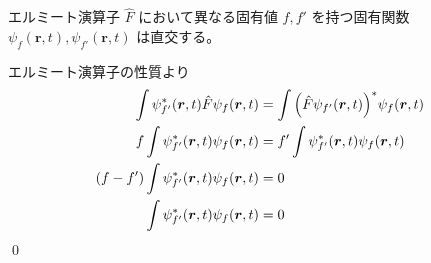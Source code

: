 \documentclass[uplatex,dvipdfmx,a4paper,11pt]{jlreq}
\makeatletter
\newcommand{\rr}{\bm{r}}
\theoremstyle{definition}
\renewenvironment{proof}[1][\proofname]{\par
  \normalfont
  \topsep6\p@\@plus6\p@ \trivlist
  \item[\hskip\labelsep{\bfseries #1}\@addpunct{\bfseries}]\ignorespaces\quad\par
}{%
  \qed\endtrivlist\@endpefalse
}
\renewcommand\proofname{証明}
\makeatother
\begin{document}
\begin{theorem}
  エルミート演算子 $\hat{F}$ において異なる固有値 $f, f'$ を持つ固有関数 $\psi_f(\rr, t), \psi_{f'}(\rr, t)$ は直交する。
\end{theorem}
\begin{proof}
  エルミート演算子の性質より
  \begin{align}
    \int\psi_{f'}^*(\rr, t)\hat{F}\psi_f(\rr, t)  & = \int\qty(\hat{F}\psi_{f'}(\rr, t))^*\psi_f(\rr, t) \\
    f\int\psi_{f'}^*(\rr, t)\psi_f(\rr, t)        & = f'\int\psi_{f'}^*(\rr, t)\psi_f(\rr, t)            \\
    (f - f')\int\psi_{f'}^*(\rr, t)\psi_f(\rr, t) & = 0                                                  \\
    \int\psi_{f'}^*(\rr, t)\psi_f(\rr, t)         & = 0
  \end{align}
\end{proof}
\end{document}
